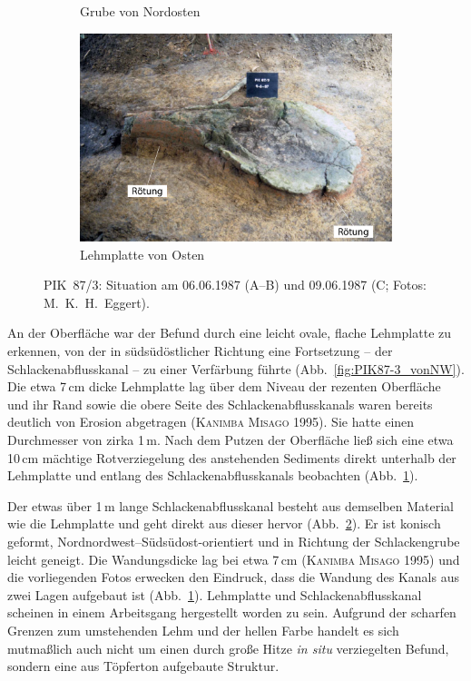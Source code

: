 \begin{figure}[p]
\begin{subfigure}[b]{.5015\textwidth}
\caption{Grube von Nordosten}
\label{fig:PIK87-3_vonNO}
\includegraphics[width = \textwidth]{fig/PIK87-3_E87-019-2.pdf}
\caption{Lehmplatte von Osten}
\label{fig:PIK87-3_vonO}
\end{subfigure}
\caption{PIK~87/3: Situation am 06.06.1987 (A--B) und 09.06.1987 (C; Fotos: M.~K.~H.~Eggert).}
 \label{fig:PIK87-3_Fotos}
\end{figure}

An der Oberfläche war der Befund durch eine leicht ovale, flache Lehmplatte zu erkennen, von der in südsüdöstlicher Richtung eine Fortsetzung -- der Schlackenabflusskanal -- zu einer Verfärbung führte (Abb.~\ref{fig:PIK87-3_vonNW}). Die etwa 7\,cm dicke Lehmplatte lag über dem Niveau der rezenten Oberfläche und ihr Rand sowie die obere Seite des Schlackenabflusskanals waren bereits deutlich von Erosion abgetragen (\textsc{Kanimba Misago} 1995). Sie hatte einen Durchmesser von zirka 1\,m. Nach dem Putzen der Oberfläche ließ sich eine etwa 10\,cm mächtige Rotverziegelung des anstehenden Sediments direkt unterhalb der Lehmplatte und entlang des Schlackenabflusskanals beobachten (Abb.~\ref{fig:PIK87-3_vonO}).

Der etwas über 1\,m lange Schlackenabflusskanal besteht aus demselben Material wie die Lehmplatte und geht direkt aus dieser hervor (Abb.~\ref{fig:PIK87-3_Fotos}). Er ist konisch geformt, Nordnordwest--Südsüdost-orientiert und in Richtung der Schlackengrube leicht geneigt. Die Wandungsdicke lag bei etwa 7\,cm (\textsc{Kanimba Misago} 1995) und die vorliegenden Fotos erwecken den Eindruck, dass die Wandung des Kanals aus zwei Lagen aufgebaut ist (Abb.~\ref{fig:PIK87-3_vonO}). Lehmplatte und Schlackenabflusskanal scheinen in einem Arbeitsgang hergestellt worden zu sein. Aufgrund der scharfen Grenzen zum umstehenden Lehm und der hellen Farbe handelt es sich mutmaßlich auch nicht um einen durch große Hitze \textit{in situ} verziegelten Befund, sondern eine aus Töpferton aufgebaute Struktur.

